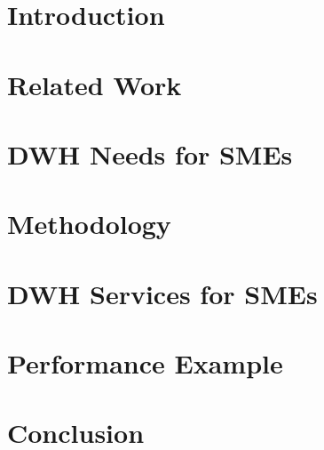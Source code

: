 \documentclass{article}
\begin{document}
\maketitle

\newpage

\begin{abstract}

\end{abstract}

\newpage

\tableofcontents

\newpage


\section{Introduction}
\label{sec:introduction}


\newpage

\section{Related Work}
\label{sec:related-work}


\newpage

\section{DWH Needs for SMEs}
\label{sec:dwh-needs-for-smes}


\newpage

\section{Methodology}
\label{sec:methodology}


\newpage

\section{DWH Services for SMEs}
\label{sec:dwh-services-for-smes}


\newpage

\section{Performance Example}
\label{sec:performance-example}


\newpage

\section{Conclusion}
\label{sec:conclusion}

\newpage
\printbibliography
\end{document}
